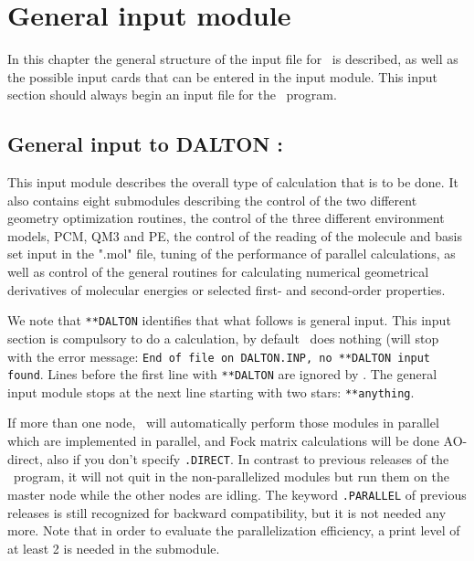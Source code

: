 \chapter{General input module}\label{ch:general}

In this chapter the general structure of the input file for \dalton\
is described, as well as the possible input cards that can be entered in
the \Sec{*DALTON} input module. This input section should always begin an
input file for the \dalton\ program.

\section{General input to DALTON : }\label{sec:general}

This input module describes the overall type of calculation that is to
be done. It also contains eight submodules describing
the control of the two different geometry optimization routines,
the control of the three different environment models, PCM, QM3 and PE,
the control of the reading of the molecule and basis set input
  in the ".mol" file,
tuning of the performance of parallel calculations,
as well as control of the general routines for calculating
numerical geometrical derivatives of molecular energies or selected
first- and second-order properties.

We note that \verb|**DALTON| identifies that what follows is general input.
This input section is compulsory to do a calculation, by default \dalton\ does nothing
(will stop with the error message:
{\tt End of file on DALTON.INP, no **DALTON input found}.
Lines before the first line with \verb|**DALTON| are ignored by \dalton .
The general input module stops at the next line starting with two stars: \verb|**anything|.

If more than one node, \dalton\ will automatically perform those modules in parallel
which are implemented in parallel, and Fock matrix calculations will be done AO-direct,
also if you don't specify \verb|.DIRECT|.
In contrast to previous releases of the \dalton\ program, it will not quit in the non-parallelized modules
but run them on the master node while the other nodes are idling.
The keyword \verb|.PARALLEL| of previous releases is still recognized for backward compatibility,
but it is not needed any more.
Note that in order to evaluate the parallelization efficiency,
a print level of at least 2 is needed in the \Sec{PARALLEL} submodule.

